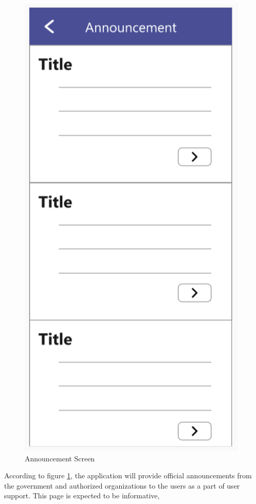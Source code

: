 \begin{enumerate}[a)]
          \begin{figure}[H]
            \centering
            \includegraphics[scale=1]{img/prototype/iter3-proto-5.png}
            \caption{Announcement Screen}
            \label{fig:iter3-proto-5}
          \end{figure}
          \par According to figure \ref{fig:iter3-proto-5}, the application will provide official announcements from the government and
          authorized organizations to the users as a part of user support. This page is expected to be informative,

\end{enumerate}
